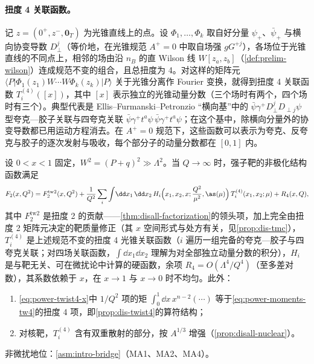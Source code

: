 \paragraph{扭度 4 关联函数。}
记 $z=(0^+,z^-,\mathbf0_T)$ 为光锥直线上的点。设 $\Phi_1,\dots,\Phi_k$ 取自好分量 $\psi_+$、$\bar\psi_+$ 与横向协变导数 $D_\perp^j$（等价地，在光锥规范 $A^+=0$ 中取自场强 $gG^{+j}$），各场位于光锥直线的不同点上，相邻的场由沿 $n_B$ 的直 Wilson 线 $W[z_a,z_b]$（\cref{def:prelim-wilson}）连成规范不变的组合，且总扭度为 4。对这样的矩阵元 $\langle P|\Phi_1(z_1)W\cdots W\Phi_k(z_k)|P\rangle$ 关于光锥分离作 Fourier 变换，就得到扭度 4 关联函数 $T^{(4)}_i([x])$，其中 $[x]$ 表示独立的光锥动量分数（三个场时有两个，四个场时有三个）。典型代表是 Ellis--Furmanski--Petronzio “横向基”中的 $\bar\psi\gamma^+D_\perp^jD_{\perp j}\psi$ 型夸克—胶子关联与四夸克关联 $\bar\psi\gamma^+t^a\psi\,\bar\psi\gamma^+t^a\psi$；在这个基中，除横向分量外的协变导数都已用运动方程消去\cite{EllisFurmanskiPetronzio1982,EllisFurmanskiPetronzio1983}。在 $A^+=0$ 规范下，这些函数可以表示为夸克、反夸克与胶子的逐次发射与吸收，每个部分子的动量分数都在 $[0,1]$ 内\cite{Jaffe1983}。

\begin{proposition}\label{prop:power-dis-twist4-x}
设 $0<x<1$ 固定，$W^2=(P+q)^2\gg\Lambda^2$。当 $Q\to\infty$ 时，强子靶的非极化结构函数满足
\begin{equation}\label{eq:power-twist4-x}
F_2(x,Q^2)=F_2^{\mathrm{tw2}}(x,Q^2)+\frac{1}{Q^2}\sum_i\int\!\dd x_1\,\dd x_2\,H_i\Big(x_1,x_2,x;\frac{Q^2}{\mu^2},\as(\mu)\Big)\,T^{(4)}_i(x_1,x_2;\mu)+R_4(x,Q),
\end{equation}
其中 $F_2^{\mathrm{tw2}}$ 是扭度 2 的贡献——\cref{thm:disall-factorization}的领头项，加上完全由扭度 2 矩阵元决定的靶质量修正（其 $x$ 空间形式与处方有关，见\cref{prop:dis-tmc}），$T^{(4)}_i$ 是上述规范不变的扭度 4 光锥关联函数（$i$ 遍历一组完备的夸克—胶子与四夸克关联；对四场关联函数，$\int\dd x_1\dd x_2$ 理解为对全部独立动量分数的积分），$H_i$ 是与靶无关、可在微扰论中计算的硬函数，余项 $R_4=O(\Lambda^4/Q^4)$（至多差对数），其系数依赖于 $x$，在 $x\to1$ 与 $x\to0$ 时不均匀。此外：
\begin{enumerate}[label=(\alph*),leftmargin=2em,itemsep=0pt,topsep=2pt]
\item \eqref{eq:power-twist4-x}中 $1/Q^2$ 项的矩 $\int_0^1\dd x\,x^{n-2}(\cdots)$ 等于\eqref{eq:power-moments-tw4}的扭度 4 项，即\cref{prop:dis-twist4}的算符结构；
\item 对核靶，$T^{(4)}_i$ 含有双重散射的部分，按 $A^{1/3}$ 增强（\cref{prop:disall-nuclear}）。
\end{enumerate}
非微扰地位：\cref{asm:intro-bridge}（MA1、MA2、MA4）。
\end{proposition}

